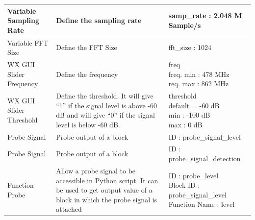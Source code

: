 \begin{table}[h]
{\begin{tabular}{|p{}|p{}|p{}|}
Variable Sampling Rate                    & Define the sampling rate                                                                                                                    & samp\_rate : 2.048 M Sample/s                                                                            \\ \hline
Variable FFT Size                         & Define the FFT Size                                                                                                                         & fft\_size : 1024                                                                                         \\ \hline
WX GUI Slider Frequency                   & Define the frequency                                                                                                                        & \makecell[lt]{freq \\ freq. min : 478 MHz \\ req. max : 862 MHz}                                                            \\ \hline
WX GUI Slider Threshold                   & Define the threshold. It will give “1” if the signal level is above -60 dB and will give “0” if the signal level is below -60 dB.           & \makecell[lt]{threshold \\ default = -60 dB \\ min : -100 dB \\ max : 0 dB}                                                   \\ \hline
Probe Signal                              & Probe output of a block                                                                                                                     & ID : probe\_signal\_level                                                                                \\ \hline
Probe Signal                              & Probe output of a block                                                                                                                     & ID : probe\_signal\_detection                                                                            \\ \hline
Function Probe                            & Allow a probe signal to be accessible in Python script. It can be used to get output value of a block in which the probe signal is attached & \makecell[lt]{ID : probe\_level \\ Block ID : probe\_signal\_level \\ Function Name : level}                                \\ \hline

\end{tabular}}
\end{table}
